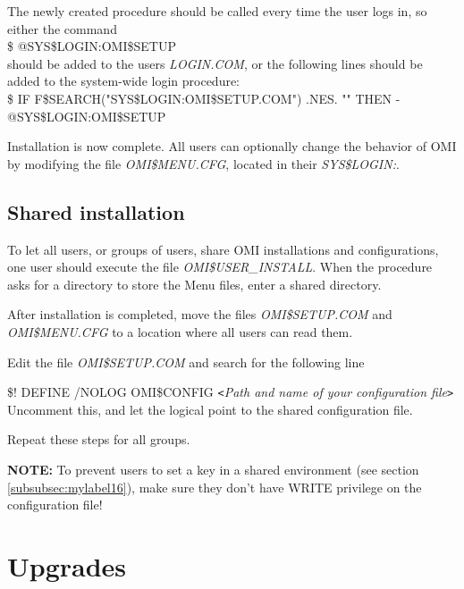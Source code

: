 \documentclass[a4paper]{book}
\newcommand{\vs}{\vspace{3mm}}
\newcommand{\lt}{\texttt{<}}
\newcommand{\gt}{\texttt{>}}
\renewcommand{\indent}{\hspace*{5mm}}
\begin{document}
The newly created procedure should be called every time the user logs in, so 
either the command \\
\indent\textsf{{\$} @SYS{\$}LOGIN:OMI{\$}SETUP}\\
should be added to the users \textsl{LOGIN.COM}, or the following lines should be 
added to the system-wide login procedure:\\
\indent\textsf{{\$} IF F{\$}SEARCH("SYS{\$}LOGIN:OMI{\$}SETUP.COM") .NES. ""  THEN - \\
\indent\indent{\$} @SYS{\$}LOGIN:OMI{\$}SETUP}

\vs

Installation is now complete. All users can optionally change the behavior 
of OMI by modifying the file \textsl{OMI{\$}MENU.CFG}, located in their 
\textsl{SYS{\$}LOGIN:}.

\subsection{Shared installation}
\label{subsubsec:shared}

To let all users, or groups of users, share OMI installations and 
configurations, one user should execute the file \textsl{OMI{\$}USER{\_}INSTALL}. 
When the procedure asks for a directory to store the Menu files, enter a 
shared directory.

\vs

After installation is completed, move the files \textsl{OMI{\$}SETUP.COM} and
\linebreak\textsl{OMI{\$}MENU.CFG} to a location where all users can read them.

Edit the file \textsl{OMI{\$}SETUP.COM} and search for the following line

\textsf{{\$}! DEFINE /NOLOG OMI{\$}CONFIG \lt\textit{Path and name of your 
configuration file}\gt} \\
Uncomment this, and let the logical point to the shared configuration file.

Repeat these steps for all groups.

\vs

\hspace{-8mm}\textbf{NOTE:} To prevent users to set a key in a shared environment
(see section \ref{subsubsec:mylabel16}), make sure they don't have WRITE privilege on the configuration file!


\section{Upgrades}
\end{document}
